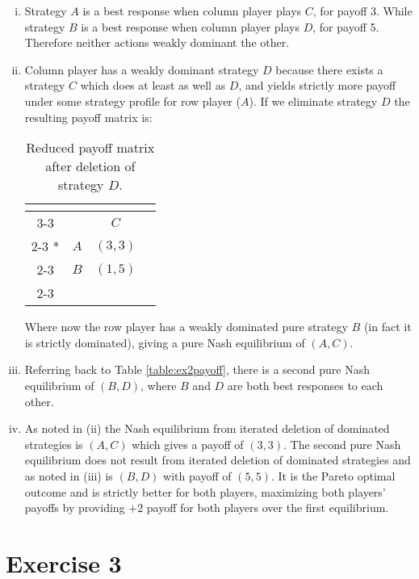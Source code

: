 \documentclass{article}
\begin{document}
\begin{enumerate}[i.]
    \item %
    Strategy $A$ is a best response when column player plays $C$, for payoff 3. While strategy $B$ is a best response when column player plays $D$, for payoff 5. Therefore neither actions weakly dominant the other.

    \item %
    Column player has a weakly dominant strategy $D$ because there exists a strategy $C$ which does at least as well as $D$, and yields strictly more payoff under some strategy profile for row player ($A$). If we eliminate strategy $D$ the resulting payoff matrix is:
        \begin{table}[H]
        \centering
          \setlength{\extrarowheight}{2pt}
          \begin{tabular}{*{4}{c|}}
            \multicolumn{1}{c}{} & \multicolumn{1}{c}{}\\\cline{3-3}
            \multicolumn{1}{c}{} &  & $C$ \\\cline{2-3}
            \multirow{1}*{}  & $A$ & $(3,3)$ \\\cline{2-3}
            & $B$ & $(1,5)$ \\\cline{2-3}
          \end{tabular}
          \caption{Reduced payoff matrix after deletion of strategy $D$.}
        \end{table}

    Where now the row player has a weakly dominated pure strategy $B$ (in fact it is strictly dominated), giving a pure Nash equilibrium of $(A, C)$.

    \item %
    Referring back to Table \ref{table:ex2payoff}, there is a second pure Nash equilibrium of $(B, D)$, where $B$ and $D$ are both best responses to each other.

    \item %
    As noted in (ii) the Nash equilibrium from iterated deletion of dominated strategies is $(A, C)$ which gives a payoff of $(3, 3)$. The second pure Nash equilibrium does not result from iterated deletion of dominated strategies and as noted in (iii) is $(B, D)$ with payoff of $(5, 5)$. It is the Pareto optimal outcome and is strictly better for both players, maximizing both players' payoffs by providing $+2$ payoff for both players over the first equilibrium.
\end{enumerate}

\section*{Exercise 3}
\end{document}
